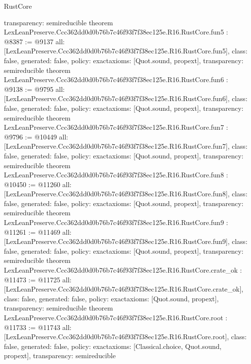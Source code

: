 \begin{lexlean}{RustCore}
\begin{coremodule}
{  transparency: semireducible
}
theorem LexLeanPreserve.Ccc362dd0d0b76b7c46f93f7f38ec125e.R16.RustCore.fun5 : @8387 := @9137 {
  all: [LexLeanPreserve.Ccc362dd0d0b76b7c46f93f7f38ec125e.R16.RustCore.fun5],
  class: false,
  generated: false,
  policy: exact{axioms: [Quot.sound, propext]},
  transparency: semireducible
}
theorem LexLeanPreserve.Ccc362dd0d0b76b7c46f93f7f38ec125e.R16.RustCore.fun6 : @9138 := @9795 {
  all: [LexLeanPreserve.Ccc362dd0d0b76b7c46f93f7f38ec125e.R16.RustCore.fun6],
  class: false,
  generated: false,
  policy: exact{axioms: [Quot.sound, propext]},
  transparency: semireducible
}
theorem LexLeanPreserve.Ccc362dd0d0b76b7c46f93f7f38ec125e.R16.RustCore.fun7 : @9796 := @10449 {
  all: [LexLeanPreserve.Ccc362dd0d0b76b7c46f93f7f38ec125e.R16.RustCore.fun7],
  class: false,
  generated: false,
  policy: exact{axioms: [Quot.sound, propext]},
  transparency: semireducible
}
theorem LexLeanPreserve.Ccc362dd0d0b76b7c46f93f7f38ec125e.R16.RustCore.fun8 : @10450 := @11260 {
  all: [LexLeanPreserve.Ccc362dd0d0b76b7c46f93f7f38ec125e.R16.RustCore.fun8],
  class: false,
  generated: false,
  policy: exact{axioms: [Quot.sound, propext]},
  transparency: semireducible
}
theorem LexLeanPreserve.Ccc362dd0d0b76b7c46f93f7f38ec125e.R16.RustCore.fun9 : @11261 := @11469 {
  all: [LexLeanPreserve.Ccc362dd0d0b76b7c46f93f7f38ec125e.R16.RustCore.fun9],
  class: false,
  generated: false,
  policy: exact{axioms: [Quot.sound, propext]},
  transparency: semireducible
}
theorem LexLeanPreserve.Ccc362dd0d0b76b7c46f93f7f38ec125e.R16.RustCore.crate_ok : @11473 := @11725 {
  all: [LexLeanPreserve.Ccc362dd0d0b76b7c46f93f7f38ec125e.R16.RustCore.crate_ok],
  class: false,
  generated: false,
  policy: exact{axioms: [Quot.sound, propext]},
  transparency: semireducible
}
theorem LexLeanPreserve.Ccc362dd0d0b76b7c46f93f7f38ec125e.R16.RustCore.root : @11733 := @11743 {
  all: [LexLeanPreserve.Ccc362dd0d0b76b7c46f93f7f38ec125e.R16.RustCore.root],
  class: false,
  generated: false,
  policy: exact{axioms: [Classical.choice, Quot.sound, propext]},
  transparency: semireducible
}


\end{coremodule}
\end{lexlean}

